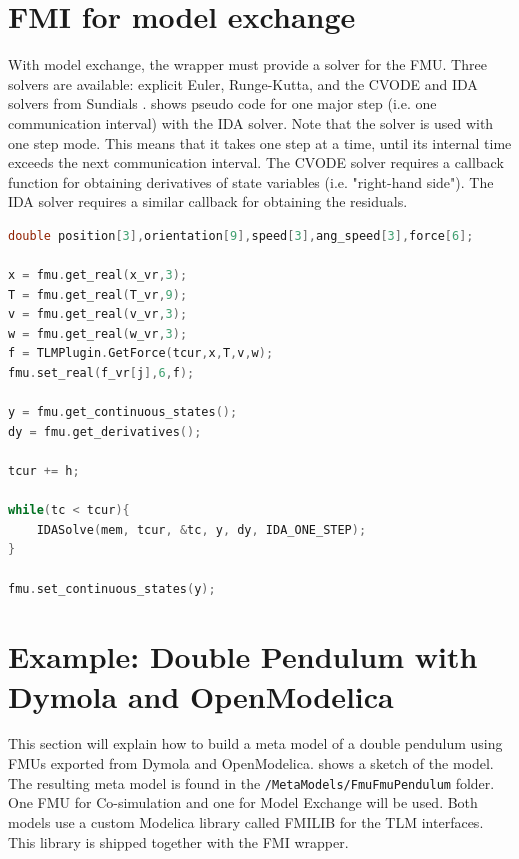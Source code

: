 \documentclass[11pt,a4paper]{report}
\begin{document}
\section{FMI for model exchange}
With model exchange, the wrapper must provide a solver for the FMU.
Three solvers are available: explicit Euler, Runge-Kutta, and the CVODE and IDA solvers from Sundials \cite{hindmarsh2005}.
 shows pseudo code for one major step (i.e. one communication interval) with the IDA solver.
Note that the solver is used with one step mode.
This means that it takes one step at a time, until its internal time exceeds the next communication interval.
The CVODE solver requires a callback function for obtaining derivatives of state variables (i.e. "right-hand side").
The IDA solver requires a similar callback for obtaining the residuals.

\begin{lstlisting}[float, language=c++, basicstyle=\ttfamily\small,floatplacement=ht,caption=Pseudo code for the simulation loop with FMI for model exchange,label=lst:wrapper_me]
double position[3],orientation[9],speed[3],ang_speed[3],force[6];

x = fmu.get_real(x_vr,3);
T = fmu.get_real(T_vr,9);
v = fmu.get_real(v_vr,3);
w = fmu.get_real(w_vr,3);
f = TLMPlugin.GetForce(tcur,x,T,v,w);
fmu.set_real(f_vr[j],6,f);

y = fmu.get_continuous_states();
dy = fmu.get_derivatives();

tcur += h;

while(tc < tcur){
    IDASolve(mem, tcur, &tc, y, dy, IDA_ONE_STEP);
}

fmu.set_continuous_states(y);
\end{lstlisting}

\section{Example: Double Pendulum with Dymola and OpenModelica}
This section will explain how to build a meta model of a double pendulum using FMUs exported from Dymola and OpenModelica.
 shows a sketch of the model.
The resulting meta model is found in the \linebreak\texttt{/MetaModels/FmuFmuPendulum} folder.
One FMU for Co-simulation and one for Model Exchange will be used.
Both models use a custom Modelica library called FMILIB for the TLM interfaces.
This library is shipped together with the FMI wrapper.
\end{document}
